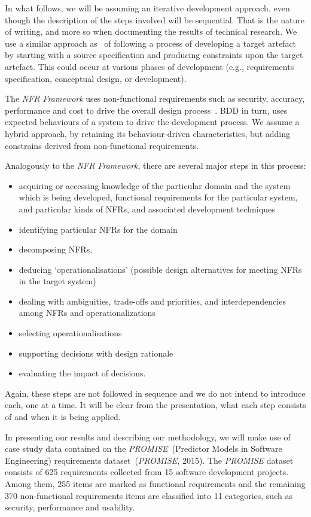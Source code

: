 \documentclass[dissertation,final]{softeng}
\begin{document}
In what follows, we will be assuming an iterative development approach, even though the description of the steps involved will be sequential. That is the nature of writing, and more so when documenting the results of technical research. We use a similar approach as~\citet{Chung2000} of following a process of developing a target artefact by starting with a source specification and producing constraints upon the target artefact. This could occur at various phases of development (e.g., requirements specification, conceptual design, or development).

The \emph{NFR Framework} uses non-functional requirements such as security, accuracy, performance and cost to drive the overall design process~\citep{Chung2000}. BDD in turn, uses expected behaviours of a system to drive the development process. We assume a hybrid approach, by retaining its behaviour-driven characteristics, but adding constrains derived from non-functional requirements.
\clearpage

Analogously to the \emph{NFR Framework}, there are several major steps in this process:
\begin{itemize}
\item acquiring or accessing knowledge of the particular domain and the system which is being developed, functional requirements for the particular system, and particular kinds of NFRs, and associated development techniques
\item identifying particular NFRs for the domain
\item decomposing NFRs,
\item deducing `operationalisations' (possible design alternatives for meeting NFRs in the target system)
\item dealing with ambiguities, trade-offs and priorities, and interdependencies among NFRs and operationalizations
\item selecting operationalisations
\item supporting decisions with design rationale
\item evaluating the impact of decisions.
\end{itemize}

Again, these steps are not followed in sequence and we do not intend to introduce each, one at a time. It will be clear from the presentation, what each step consists of and when it is being applied.

In presenting our results and describing our methodology, we will make use of case study data contained on the \emph{PROMISE}~(Predictor Models in Software Engineering) requirements dataset~(\emph{PROMISE}, 2015). The \emph{PROMISE} dataset consists of 625 requirements collected from 15 software development projects. Among them, 255 items are marked as functional requirements and the remaining 370 non-functional requirements items are classified into 11 categories, such as security, performance and usability.
\end{document}
